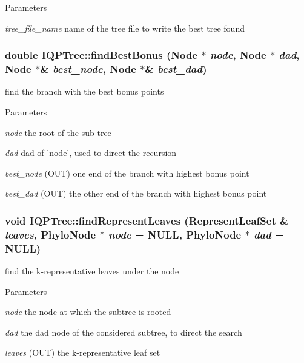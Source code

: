 \begin{DoxyParams}{Parameters}
\item[{\em tree\_\-file\_\-name}]name of the tree file to write the best tree found \end{DoxyParams}
\hypertarget{classIQPTree_a96cbd6e8fa106324e176fa15c6c7e77a}{
\subsubsection[{findBestBonus}]{\setlength{\rightskip}{0pt plus 5cm}double IQPTree::findBestBonus ({\bf Node} $\ast$ {\em node}, \/  {\bf Node} $\ast$ {\em dad}, \/  {\bf Node} $\ast$\& {\em best\_\-node}, \/  {\bf Node} $\ast$\& {\em best\_\-dad})}}
\label{classIQPTree_a96cbd6e8fa106324e176fa15c6c7e77a}
find the branch with the best bonus points 
\begin{DoxyParams}{Parameters}
\item[{\em node}]the root of the sub-\/tree \item[{\em dad}]dad of 'node', used to direct the recursion \item[{\em best\_\-node}](OUT) one end of the branch with highest bonus point \item[{\em best\_\-dad}](OUT) the other end of the branch with highest bonus point \end{DoxyParams}
\hypertarget{classIQPTree_a008a05f575902d53ca355452a8e63082}{
\subsubsection[{findRepresentLeaves}]{\setlength{\rightskip}{0pt plus 5cm}void IQPTree::findRepresentLeaves (RepresentLeafSet \& {\em leaves}, \/  {\bf PhyloNode} $\ast$ {\em node} = {\ttfamily NULL}, \/  {\bf PhyloNode} $\ast$ {\em dad} = {\ttfamily NULL})}}
\label{classIQPTree_a008a05f575902d53ca355452a8e63082}
find the k-\/representative leaves under the node 
\begin{DoxyParams}{Parameters}
\item[{\em node}]the node at which the subtree is rooted \item[{\em dad}]the dad node of the considered subtree, to direct the search \item[{\em leaves}](OUT) the k-\/representative leaf set \end{DoxyParams}
